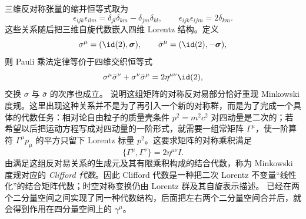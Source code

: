 三维反对称张量的缩并恒等式取为
\begin{equation}
 {
 \epsilon_{ijk}\epsilon_{ilm}
 =\delta_{jl}\delta_{km}-\delta_{jm}\delta_{kl},
 \qquad
 \epsilon_{ijk}\epsilon_{ijm}=2\delta_{km}.}
 \label{eq:epsilon-contractions-r10}
\end{equation}
这些关系随后把三维自旋代数嵌入四维 Lorentz 结构。定义
\begin{equation}
 \sigma^\mu=(\id(2),\boldsymbol\sigma),
 \qquad
 \bar\sigma^\mu=(\id(2),-\boldsymbol\sigma),
 \label{eq:sigma-barsigma-foundation-r10}
\end{equation}
则 Pauli 乘法定律等价于四维交织恒等式
\begin{equation}
 {
 \sigma^\mu\bar\sigma^\nu+\sigma^\nu\bar\sigma^\mu
 =2\eta^{\mu\nu}\id(2),}
 \label{eq:sigmabar-proof-r10}
\end{equation}
交换 $\sigma$ 与 $\bar\sigma$ 的次序也成立。 说明这组矩阵的对称反对易部分恰好重现 Minkowski 度规。这里出现这种关系并不是为了再引入一个新的对称群，而是为了完成一个具体的代数任务：相对论自由粒子的质量壳条件 $p^2=m^2c^2$ 对四动量是二次的；若希望以后把运动方程写成对四动量的一阶形式，就需要一组常矩阵 $\Gamma^\mu$，使一阶算符 $\Gamma^\mu p_\mu$ 的平方只留下 Lorentz 标量 $p^2$。这要求矩阵的对称乘积满足
\begin{equation*}
 \{\Gamma^\mu,\Gamma^\nu\}=2\eta^{\mu\nu}I.
\end{equation*}
由满足这组反对易关系的生成元及其有限乘积构成的结合代数，称为 Minkowski 度规对应的 \emph{Clifford 代数}。因此 Clifford 代数是一种把二次 Lorentz 不变量“线性化”的结合矩阵代数；时空对称变换仍由 Lorentz 群及其自旋表示描述。 已经在两个二分量空间之间实现了同一种代数结构，后面把左右两个二分量空间合并后，就会得到作用在四分量空间上的 $\gamma^\mu$。
